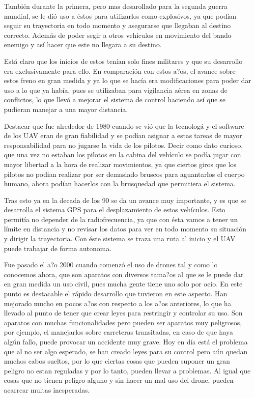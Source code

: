 \documentclass{article}
\begin{document}
\hspace{1 cm} Tambi\'en durante la primera, pero mas desarollado para la segunda guerra mundial, se le di\'o uso a \'estos para utilizarlos como explosivos, ya que pod\'ian seguir su trayectoria en todo momento y asegurarse que llegaban al destino correcto. Adem\'as de poder segir a otros veh\'iculos en movimiento del bando enemigo y as\'i hacer que este no llegara a su destino. 

\hspace{1 cm} Est\'a claro que los inicios de estos ten\'ian solo fines militares y que su desarrollo era exclusivamente para ello. En comparaci\'on con estos a?os, el avance sobre estos freno en gran medida y ya lo que se hac\'ia era modificaciones para poder dar uso a lo que ya hab\'ia, pues se utilizaban para vigilancia a\'erea en zonas de conflictos, lo que llev\'o a mejorar el sistema de control haciendo as\'i que se pudieran manejar a una mayor distancia. 

\hspace{1 cm}Destacar que fue alrededor de 1980 cuando se vi\'o que la tecnolog\'a y el software de los UAV eran de gran fiabilidad y se pod\'ian asignar a estas tareas de mayor responsabilidad para no jugarse la vida de los pilotos. Decir como dato curioso, que una vez no estaban los pilotos en la cabina del veh\'iculo se pod\'ia jugar con mayor libertad a la hora de realizar movimientos, ya que ciertos giros que los pilotos no podian realizar por ser demasiado bruscos para aguantarlos el cuerpo humano, ahora pod\'ian hacerlos con la brusquedad que permitiera el sistema.  

\hspace{1 cm} Tras esto ya en la decada de los 90 se da un avance muy importante, y es que se desarrolla el sistema GPS para el desplazamiento de estos veh\'iculos. Esto permit\'ia no depender de la radiofrecuencia, ya que con \'esta vamos a tener un l\'imite en distancia y no revisar los datos para ver en todo momento su situaci\'on y dirigir la trayectoria. Con \'este sistema se traza una ruta al inicio y el UAV puede trabajar de forma autonoma. 

\hspace{1 cm} Fue pasado el a?o 2000 cuando comenz\'o el uso de drones tal y como lo conocemos ahora, que son aparatos con diversos tama?os al que se le puede dar en gran medida un uso civil, pues mucha gente tiene uno solo por ocio. En este punto es destacable el r\'apido desarrollo que tuvieron en este aspecto. Han mejorado mucho en pocos a?os con respecto a los a?os anteriores, lo que ha llevado al punto de tener que crear leyes para restringir y controlar su uso. Son aparatos con muchas funcionalidades pero pueden ser aparatos muy peligrosos, por ejemplo, el manejarlos sobre carreteras transitadas, en caso de que haya alg\'un fallo, puede provocar un accidente muy grave. Hoy en d\'ia est\'a el problema que al no ser algo esperado, se han creado leyes para su control pero a\'un quedan muchos cabos sueltos, por lo que ciertas cosas que pueden suponer un gran peligro no estan reguladas y por lo tanto, pueden llevar a problemas. Al igual que cosas que no tienen peligro alguno y sin hacer un mal uso del drone, pueden acarrear multas inesperadas.
\end{document}
